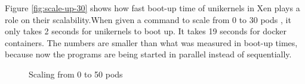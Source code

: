 Figure \ref{fig:scale-up-30} shows how fast boot-up time of unikernels in Xen plays a role on their scalability.When given a command to scale from 0 to 30 pods , it only takes 2 seconds for unikernels to boot up. It takes 19 seconds for docker containers. The numbers are smaller than what was measured in boot-up times, because now the programs are being started in parallel instead of sequentially. 


\begin{figure}[htpb]
  \centering
  \caption{Scaling from 0 to 50 pods}\label{fig:scale-up-50}
  \end{figure}

